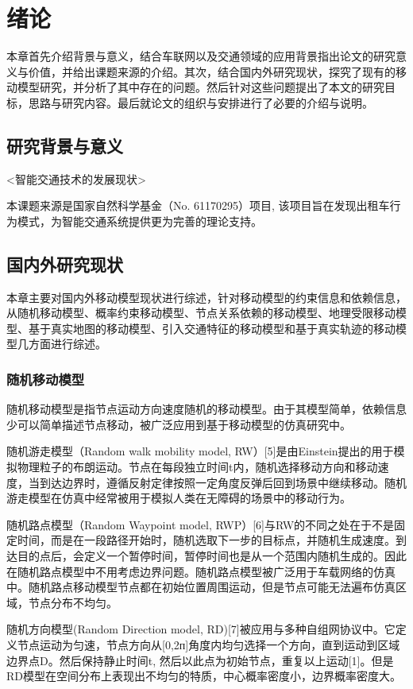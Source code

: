 \chapter{绪论}

本章首先介绍背景与意义，结合车联网以及交通领域的应用背景指出论文的研究意义与价值，并给出课题来源的介绍。其次，结合国内外研究现状，探究了现有的移动模型研究，并分析了其中存在的问题。然后针对这些问题提出了本文的研究目标，思路与研究内容。最后就论文的组织与安排进行了必要的介绍与说明。

\section{研究背景与意义}
<智能交通技术的发展现状>

本课题来源是国家自然科学基金（No. 61170295）项目, 该项目旨在发现出租车行为模式，为智能交通系统提供更为完善的理论支持。
\section{国内外研究现状}
本章主要对国内外移动模型现状进行综述，针对移动模型的约束信息和依赖信息，从随机移动模型、概率约束移动模型、节点关系依赖的移动模型、地理受限移动模型、基于真实地图的移动模型、引入交通特征的移动模型和基于真实轨迹的移动模型几方面进行综述。
\subsection{随机移动模型}

随机移动模型是指节点运动方向速度随机的移动模型。由于其模型简单，依赖信息少可以简单描述节点移动，被广泛应用到基于移动模型的仿真研究中。

随机游走模型（Random walk mobility model, RW）[5]是由Einstein提出的用于模拟物理粒子的布朗运动。节点在每段独立时间t内，随机选择移动方向和移动速度，当到达边界时，遵循反射定律按照一定角度反弹后回到场景中继续移动。随机游走模型在仿真中经常被用于模拟人类在无障碍的场景中的移动行为。

随机路点模型（Random Waypoint model, RWP）[6]与RW的不同之处在于不是固定时间，而是在一段路径开始时，随机选取下一步的目标点，并随机生成速度。到达目的点后，会定义一个暂停时间，暂停时间也是从一个范围内随机生成的。因此在随机路点模型中不用考虑边界问题。随机路点模型被广泛用于车载网络的仿真中。随机路点移动模型节点都在初始位置周围运动，但是节点可能无法遍布仿真区域，节点分布不均匀。

随机方向模型(Random Direction model, RD)[7]被应用与多种自组网协议中。它定义节点运动为匀速，节点方向从[0,2ᴨ]角度内均匀选择一个方向，直到运动到区域边界点D。然后保持静止时间t, 然后以此点为初始节点，重复以上运动[1]。但是RD模型在空间分布上表现出不均匀的特质，中心概率密度小，边界概率密度大。

